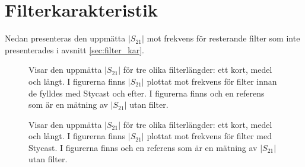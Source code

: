 \documentclass[../../main.tex]{subfiles}
\begin{document}
\chapter{Filterkarakteristik}
\label{app:filterkar}

Nedan presenteras den uppmätta $|S_{21}|$ mot frekvens för resterande filter som inte presenterades i avsnitt \ref{sec:filter_kar}.

\begin{figure}[H]
    \centerfloat
    \begin{subfigure}[t]{0.329\textwidth}
        \centerfloat
        \setlength{}
        \setlength\figureheight{11em}
        
    \end{subfigure}
    \begin{subfigure}[t]{0.329\textwidth}
        \centerfloat
        \setlength{}
        \setlength\figureheight{11em}
        
    \end{subfigure}
    \begin{subfigure}[t]{0.329\textwidth}
        \centering
        \setlength{}
        \setlength\figureheight{11em}
        
    \end{subfigure}
    \caption{Visar den uppmätta $|S_{21}|$ för tre olika filterlängder: ett kort, medel och långt. I figurerna finns $|S_{21}|$ plottat mot frekvens för filter innan de fylldes med Stycast och efter. I figurerna finns och en referens som är en mätning av $|S_{21}|$ utan filter.}
    \label{fig:filter_kar}
\end{figure}


\begin{figure}[H]
    \centerfloat
    \begin{subfigure}[t]{0.329\textwidth}
        \centerfloat
        \setlength{}
        \setlength\figureheight{11em}
        
    \end{subfigure}
    \begin{subfigure}[t]{0.329\textwidth}
        \centerfloat
        \setlength{}
        \setlength\figureheight{11em}
        
    \end{subfigure}
    \begin{subfigure}[t]{0.329\textwidth}
        \centering
        \setlength{}
        \setlength\figureheight{11em}
        
    \end{subfigure}
    \caption{Visar den uppmätta $|S_{21}|$ för tre olika filterlängder: ett kort, medel och långt. I figurerna finns $|S_{21}|$ plottat mot frekvens för filter med Stycast. I figurerna finns och en referens som är en mätning av $|S_{21}|$ utan filter.}
    \label{fig:filter_kar}
\end{figure}
\end{document}
